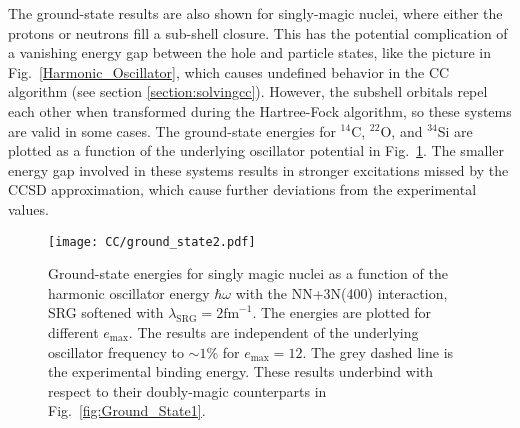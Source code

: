 \documentclass[thesis.tex]{subfiles}
\begin{document}
The ground-state results are also shown for singly-magic nuclei, where either the protons or neutrons fill a sub-shell closure.  This has the potential complication of a vanishing energy gap between the hole and particle states, like the picture in Fig.\ \ref{Harmonic_Oscillator}, which causes undefined behavior in the CC algorithm (see section \ref{section:solvingcc}).  However, the subshell orbitals repel each other when transformed during the Hartree-Fock algorithm, so these systems are valid in some cases.  The ground-state energies for ${}^{14}$C, ${}^{22}$O, and ${}^{34}$Si are plotted as a function of the underlying oscillator potential in Fig.\ \ref{fig:Ground_State2}.  The smaller energy gap involved in these systems results in stronger excitations missed by the CCSD approximation, which cause further deviations from the experimental values.
\begin{figure}[h!]
  \centering
  \texttt{[image: CC/ground\_state2.pdf]}
  \caption{Ground-state energies for singly magic nuclei as a function of the harmonic oscillator energy $\hbar\omega$ with the NN+3N(400) interaction, SRG softened with $\lambda_{\mathrm{SRG}}=2\mathrm{fm}^{-1}$.  The energies are plotted for different $e_\mathrm{max}$.  The results are independent of the underlying oscillator frequency to $\sim 1\%$ for $e_\mathrm{max}=12$.  The grey dashed line is the experimental binding energy.  These results underbind with respect to their doubly-magic counterparts in Fig.\ \ref{fig:Ground_State1}.}
  \label{fig:Ground_State2}
\end{figure}
\end{document}
